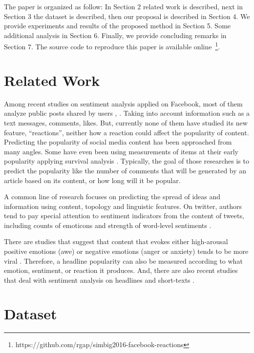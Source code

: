 \documentclass[9pt]{article}
\begin{document}
The paper is organized as follow: In Section 2 related work is described, next in Section 3 the dataset is described, then our proposal is described in Section 4. We provide experiments and results of the proposed method in Section 5. Some additional analysis in Section 6. Finally, we provide concluding remarks in Section 7. The source code to reproduce this paper is available online~\footnote{https://github.com/rgap/simbig2016-facebook-reactions}.


\section{Related Work}

Among recent studies on sentiment analysis applied on Facebook, most of them analyze public posts shared by users \cite{rastogi2014sentiment}, \cite{gao2015more}. Taking into account information such as a text messages, comments, likes. But, currently none of them have studied its new feature, ``reactions'', neither how a reaction could affect the popularity of content. Predicting the popularity of social media content has been approached from many angles. Some have even been using measurements of items at their early popularity applying survival analysis \cite{lee2010approach}. Typically, the goal of those researches is to predict the popularity like the number of comments that will be generated by an article based on its content, or how long will it be popular.

A common line of research focuses on predicting the spread of ideas and information using content, topology and linguistic features. On twitter, authors tend to pay special attention to sentiment indicators from the content of tweets, including counts of emoticons and strength of word-level sentiments \cite{kong2014predicting}.

There are studies that suggest that content that evokes either high-arousal positive emotions (awe) or negative emotions (anger or anxiety) tends to be more viral \cite{berger2013emotion}. Therefore, a headline popularity can also be measured according to what emotion, sentiment, or reaction it produces. And, there are also recent studies that deal with sentiment analysis on headlines and short-texts \cite{nassirtoussi2015text}. 


\section{Dataset}
\end{document}
